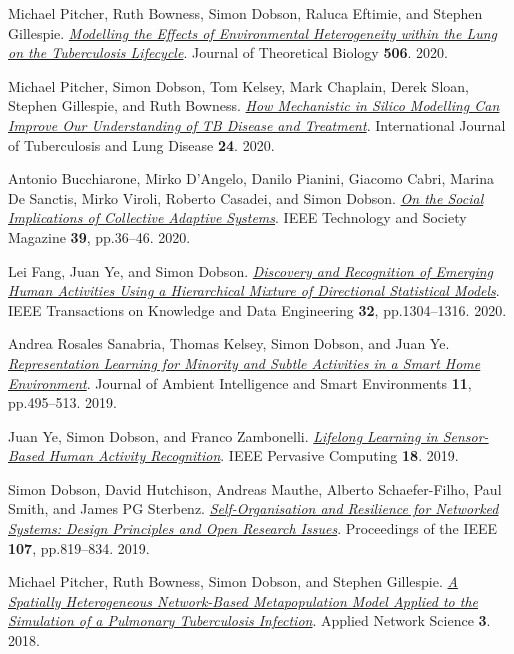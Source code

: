 \documentclass[11pt]{article}
\begin{document}
\label{org9be135d}Michael Pitcher, Ruth Bowness, Simon Dobson, Raluca Eftimie, and Stephen Gillespie.  \emph{\href{https://dx.doi.org//10.1101/2019.12.12.871269 }{Modelling the Effects of Environmental Heterogeneity within the Lung on the Tuberculosis Lifecycle}}. Journal of Theoretical Biology \textbf{506}. 2020.

\label{org93f7af5}Michael Pitcher, Simon Dobson, Tom Kelsey, Mark Chaplain, Derek Sloan, Stephen Gillespie, and Ruth Bowness.  \emph{\href{https://doi.org/10.5588/ijtld.20.0107}{How Mechanistic in Silico Modelling Can Improve Our Understanding of TB Disease and Treatment}}. International Journal of Tuberculosis and Lung Disease \textbf{24}. 2020.

\label{orgf020ba4}Antonio Bucchiarone, Mirko D’Angelo, Danilo Pianini, Giacomo Cabri, Marina De Sanctis, Mirko Viroli, Roberto Casadei, and Simon Dobson.  \emph{\href{http://dx.doi.org/10.1109/MTS.2020.3012324}{On the Social Implications of Collective Adaptive Systems}}. IEEE Technology and Society Magazine \textbf{39}, pp.36–46. 2020.

\label{org178419f}Lei Fang, Juan Ye, and Simon Dobson.  \emph{\href{https://dx.doi.org//10.1109/TKDE.2019.2905207}{Discovery and Recognition of Emerging Human Activities Using a Hierarchical Mixture of Directional Statistical Models}}. IEEE Transactions on Knowledge and Data Engineering \textbf{32}, pp.1304–1316. 2020.

\label{org131d2f5}Andrea Rosales Sanabria, Thomas Kelsey, Simon Dobson, and Juan Ye.  \emph{\href{https://dx.doi.org//10.3233/AIS-190541}{Representation Learning for Minority and Subtle Activities in a Smart Home Environment}}. Journal of Ambient Intelligence and Smart Environments \textbf{11}, pp.495–513. 2019.

\label{orgec5af8f}Juan Ye, Simon Dobson, and Franco Zambonelli.  \emph{\href{https://dx.doi.org//10.1109/MPRV.2019.2913933}{Lifelong Learning in Sensor-Based Human Activity Recognition}}. IEEE Pervasive Computing \textbf{18}. 2019.

\label{org0cd3999}Simon Dobson, David Hutchison, Andreas Mauthe, Alberto Schaefer-Filho, Paul Smith, and James PG Sterbenz.  \emph{\href{https://dx.doi.org//10.1109/JPROC.2019.2894512}{Self-Organisation and Resilience for Networked Systems: Design Principles and Open Research Issues}}. Proceedings of the IEEE \textbf{107}, pp.819–834. 2019.

\label{org70adcef}Michael Pitcher, Ruth Bowness, Simon Dobson, and Stephen Gillespie.  \emph{\href{https://dx.doi.org//10.1007/s41109-018-0091-2}{A Spatially Heterogeneous Network-Based Metapopulation Model Applied to the Simulation of a Pulmonary Tuberculosis Infection}}. Applied Network Science \textbf{3}. 2018.
\end{document}
